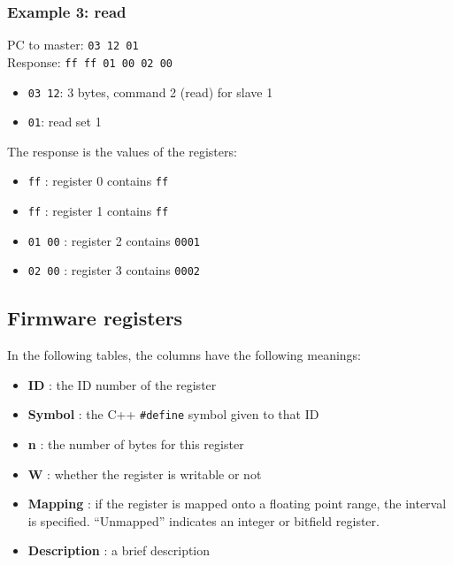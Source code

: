 \subsubsection{Example 3: read}
PC to master: \verb+03 12 01+ \\
Response: \verb+ff ff 01 00 02 00+ 
\begin{itemize}
\item \verb+03 12+: 3 bytes, command 2 (read) for slave 1
\item \verb+01+: read set 1
\end{itemize}
The response is the values of the registers:
\begin{itemize}
\item \verb+ff+ : register 0 contains \verb+ff+ 
\item \verb+ff+ : register 1 contains \verb+ff+ 
\item \verb+01 00+ : register 2 contains \verb+0001+ 
\item \verb+02 00+ : register 3 contains \verb+0002+ 
\end{itemize}

\subsection{Firmware registers}
\label{firmrec}
%


In the following tables, the columns have the following meanings:
\begin{itemize}
\item \textbf{ID} : the ID number of the register
\item \textbf{Symbol} : the C++ \verb+#define+ symbol given to that ID
\item \textbf{n} : the number of bytes for this register
\item \textbf{W} : whether the register is writable or not
\item \textbf{Mapping} : if the register is mapped onto a floating point range, the interval is specified. ``Unmapped'' indicates an integer or bitfield register.
\item \textbf{Description} : a brief description
\end{itemize}



